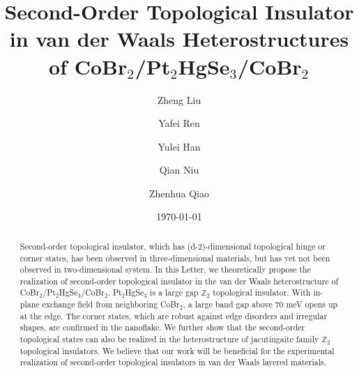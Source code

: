 \documentclass[aps,prl,twocolumn,showpacs,superscriptaddress]{revtex4-1}
\begin{document}
\title{Second-Order Topological Insulator in van der Waals Heterostructures of CoBr$_2$/Pt$_2$HgSe$_3$/CoBr$_2$}
\author{Zheng Liu}
\author{Yafei Ren}
\author{Yulei Han}
\author{Qian Niu}
\author{Zhenhua Qiao}

\date{\today{}}

\begin{abstract}
  Second-order topological insulator, which has (d-2)-dimensional topological hinge or corner states, has been observed in three-dimensional materials, but has yet not been observed in two-dimensional system. In this Letter, we theoretically propose the realization of second-order topological insulator in the van der Waals heterostructure of CoBr$_2$/Pt$_2$HgSe$_3$/CoBr$_2$. Pt$_2$HgSe$_3$ is a large gap $\mathbb{Z}_2$ topological insulator. With in-plane exchange field from neighboring CoBr$_2$, a large band gap above 70 meV opens up at the edge. The corner states, which are robust against edge disorders and irregular shapes, are confirmed in the nanoflake. We further show that the second-order topological states can also be realized in the heterostructure of jacutingaite family $\mathbb{Z}_2$ topological insulators. We believe that our work will be beneficial for the experimental realization of second-order topological insulators in van der Waals layered materials.
\end{abstract}

\maketitle
\end{document}
